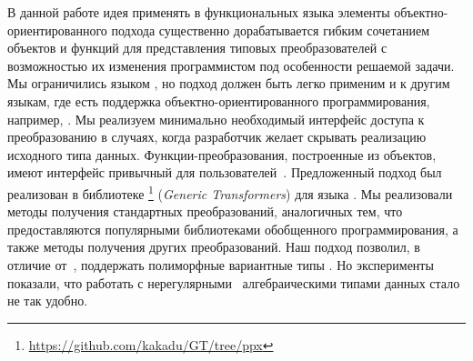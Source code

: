 В данной работе\! идея применять в функциональных языка  элементы объектно-ориентированного подхода существенно дорабатывается гибким сочетанием объектов и функций для представления типовых преобразователей с возможностью их изменения программистом под особенности решаемой задачи. Мы ограничились языком \ocaml{}, но подход должен быть легко применим и к другим языкам, где есть поддержка объектно-ориентированного программирования, например, \Scala{}. %
Мы реализуем  минимально необходимый интерфейс доступа к преобразованию в  случаях, когда разработчик желает скрывать реализацию исходного типа данных.
Функции-преобразования, построенные из объектов, имеют интерфейс привычный для пользователей~\cite{ppxderiving}.
Предложенный подход был реализован в  библиотеке \GT{}\footnote{\url{https://github.com/kakadu/GT/tree/ppx}} (\emph{Generic Transformers}) для языка \ocaml{}. Мы  реализовали методы получения стандартных преобразований, аналогичных тем, что предоставляются популярными библиотеками обобщенного программирования, а также методы получения других преобразований.
Наш подход позволил, в отличие от~\cite{Visitors},  поддержать полиморфные вариантные типы  \ocaml{}. Но эксперименты показали, что  работать с нерегулярными~\cite{irregular} алгебраическими типами данных стало не так удобно.

